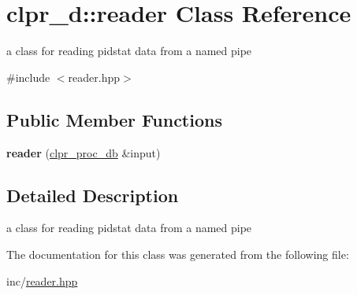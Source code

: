 \hypertarget{classclpr__d_1_1reader}{\section{clpr\-\_\-d\-:\-:reader \-Class \-Reference}
\label{classclpr__d_1_1reader}
}


a class for reading pidstat data from a named pipe  




{\ttfamily \#include $<$reader.\-hpp$>$}

\subsection*{\-Public \-Member \-Functions}
\begin{DoxyCompactItemize}
\item 
\hypertarget{classclpr__d_1_1reader_ad658097c1403714786df6c5a58c22ca0}{{\bfseries reader} (\hyperlink{classclpr__d_1_1clpr__proc__db}{clpr\-\_\-proc\-\_\-db} \&input)}\label{classclpr__d_1_1reader_ad658097c1403714786df6c5a58c22ca0}

\end{DoxyCompactItemize}


\subsection{\-Detailed \-Description}
a class for reading pidstat data from a named pipe 

\-The documentation for this class was generated from the following file\-:\begin{DoxyCompactItemize}
\item 
inc/\hyperlink{reader_8hpp}{reader.\-hpp}\end{DoxyCompactItemize}
